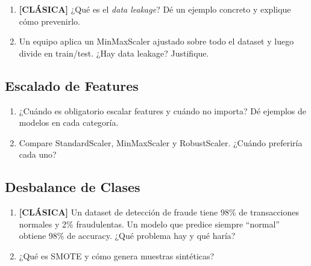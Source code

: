 \documentclass[11pt,a4paper]{article}
\begin{document}
\begin{enumerate}[label=\textbf{P\arabic*.}, resume]

\item \leavevmode

\begin{classicbox}
\textcolor{tdred}{\textbf{[CL\'ASICA]}} ¿Qu\'e es el \textit{data leakage}? D\'e un
ejemplo concreto y explique c\'omo prevenirlo.
\end{classicbox}

\item Un equipo aplica un MinMaxScaler ajustado sobre todo el dataset y luego divide en
  train/test. ¿Hay data leakage? Justifique.

\end{enumerate}

\subsection{Escalado de Features}

\begin{enumerate}[label=\textbf{P\arabic*.}, resume]

\item ¿Cu\'ando es obligatorio escalar features y cu\'ando no importa? D\'e ejemplos de
  modelos en cada categor\'ia.

\item Compare StandardScaler, MinMaxScaler y RobustScaler. ¿Cu\'ando preferir\'ia cada uno?

\end{enumerate}

\subsection{Desbalance de Clases}

\begin{enumerate}[label=\textbf{P\arabic*.}, resume]

\item \leavevmode

\begin{classicbox}
\textcolor{tdred}{\textbf{[CL\'ASICA]}} Un dataset de detecci\'on de fraude tiene 98\%
de transacciones normales y 2\% fraudulentas. Un modelo que predice siempre ``normal''
obtiene 98\% de accuracy. ¿Qu\'e problema hay y qu\'e har\'ia?
\end{classicbox}

\item ¿Qu\'e es SMOTE y c\'omo genera muestras sint\'eticas?

\end{enumerate}
\end{document}
